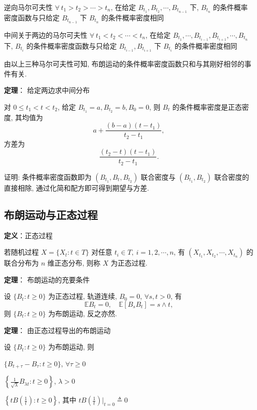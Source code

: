 \documentclass[openany]{ctexbook}
\theoremstyle{kaiti}
\theoremstyle{normal}
\begin{document}
逆向马尔可夫性
$\forall~t_1>t_2>\cdots>t_n$, 在给定 $B_{t_1},B_{t_2},\cdots,B_{t_{n-1}}$ 下, $B_{t_n}$ 的条件概率密度函数与只给定 $B_{t_{n-1}}$ 下 $B_{t_n}$ 的条件概率密度相同

中间关于两边的马尔可夫性
$\forall~t_1<t_2<\cdots<t_n$, 在给定 $B_{t_1},\cdots,B_{t_{i-1}},B_{t_{i+1}},\cdots,B_{t_{n}}$ 下, $B_{t_i}$ 的条件概率密度函数与只给定 $B_{t_{i-1}},B_{t_{i+1}}$ 下 $B_{t_i}$ 的条件概率密度相同

由以上三种马尔可夫性可知, 布朗运动的条件概率密度函数只和与其刚好相邻的事件有关.

\textbf{定理}： 给定两边求中间分布

对 $0\leqslant t_1<t<t_2$, 给定 $B_{t_1}=a,B_{t_2}=b,B_0=0$, 则 $B_t$ 的条件概率密度是正态密度, 其均值为
\begin{equation}
  a+\frac{(b-a)(t-t_1)}{t_2-t_1},
\end{equation}
 方差为
\begin{equation}
  \frac{(t_2-t)(t-t_1)}{t_2-t_1}.
\end{equation}


证明: 条件概率密度函数即为 $(B_{t_1},B_t,B_{t_2})$ 联合密度与 $(B_{t_1},B_{t_2})$ 联合密度的直接相除, 通过化简和配方即可得到期望与方差.

\subsection{布朗运动与正态过程}

\textbf{定义}：正态过程

若随机过程 $X=\{X_t:t\in T\}$ 对任意 $t_i\in T,~i=1,2,\cdots,n$, 有 $(X_{t_1},X_{t_2},\cdots,X_{t_n})$ 的联合分布为 $n$ 维正态分布, 则称 $X$ 为正态过程.

\textbf{定理}： 布朗运动的充要条件

设 $\{B_t:t\geqslant0\}$ 为正态过程, 轨道连续, $B_0=0$, $\forall s,t>0$, 有
\begin{equation}
  \mathbb{E}B_t=0,\quad \mathbb{E}[B_sB_t]=s\wedge t,
\end{equation}
 则 $\{B_t:t\geqslant0\}$ 为布朗运动, 反之亦然.

\textbf{定理}： 由正态过程导出的布朗运动

设 $\{B_t:t\geqslant0\}$ 为布朗运动, 则

$\{B_{t+\tau}-B_\tau:t\geqslant0\}$, $\forall \tau\geqslant0$

$\displaystyle\left\{\frac{1}{\sqrt{\lambda}}B_{\lambda t}:t\geqslant0\right\}$, $\lambda>0$

$\displaystyle\left\{tB\left(\frac{1}{t}\right):t\geqslant0\right\}$, 其中 $\displaystyle tB\left(\frac{1}{t}\right)\bigg|_{t=0}\triangleq0$
\end{document}
